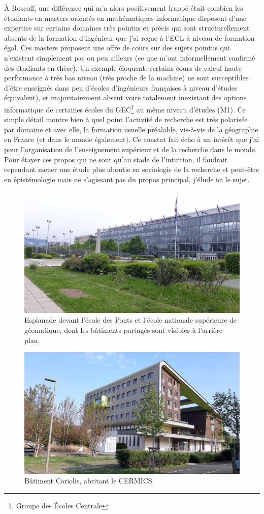 \documentclass[svgnames,dvipsnames,a4paper,10pt,french]{report}
\begin{document}
À Roscoff, une différence qui m'a alors positivement frappé était combien les étudiants en masters orientés en mathématiques-informatique disposent d'une expertise sur certains domaines très pointus et précis qui sont structurellement absents de la formation d'ingénieur que j'ai reçue à l'ECL à niveau de formation égal. Ces masters proposent une offre de cours sur des sujets pointus qui n'existent simplement pas ou peu ailleurs (ce que m'ont informellement confirmé  des étudiants en thèse). Un exemple éloquent: certains cours de calcul haute performance à très bas niveau (très proche de la machine) ne sont susceptibles d'être enseignés dans peu d'écoles d'ingénieurs françaises à niveau d'études équivalent), et majoritairement absent voire totalement inexistant des options informatique de certaines écoles du GEC\footnote{Groupe des Écoles Centrale} au même niveau d'études (M1). Ce simple détail montre bien à quel point l'activité de recherche est très polarisée par domaine et avec elle, la formation usuelle préalable, vis-à-vis de la géographie en France (et dans le monde également). Ce constat fait écho à un intérêt que j'ai pour l'organisation de l'enseignement supérieur et de la recherche dans le monde. Pour étayer ces propos qui ne sont qu'au stade de l'intuition, il faudrait cependant mener une étude plus aboutie en sociologie de la recherche et peut-être en épistémologie mais ne s'agissant pas du propos principal, j'élude ici le sujet.




\begin{figure}
    \centering
    \includegraphics[width=.7\textwidth]{images/esplanade.jpg}
    \caption{Esplanade devant l'école des Ponts et l'école nationale supérieure de géomatique, dont les bâtiments partagés sont visibles à l'arrière-plan.}
    \label{fig:explanade}
\end{figure}

\begin{figure}
    \centering
    \includegraphics[width=.7\textwidth]{images/coriolis.jpg}
    \caption{Bâtiment Coriolis, abritant le CERMICS.}
    \label{fig:explanade}
\end{figure}
\end{document}

